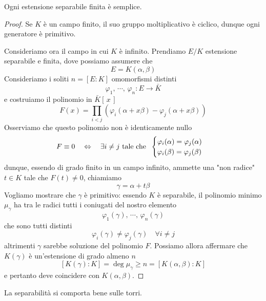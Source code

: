 \begin{multicols}{2}
\begin{theorem}\label{primitivo}
	Ogni estensione separabile finita è semplice.
\end{theorem}
\begin{proof}
	Se $ K $ è un campo finito, il suo gruppo moltiplicativo è ciclico, dunque ogni generatore è primitivo.
	
	Consideriamo ora il campo in cui $ K $ è infinito.
	Prendiamo $ E/K $ estensione separabile e finita, dove possiamo assumere che
	\[ E = K(\alpha, \beta) \]
	Consideriamo i soliti $ n = [E:K] $ omomorfismi distinti
	\[ \varphi_1,\, \cdots,\, \varphi_n : E \to \bar{K}  \]
	e costruiamo il polinomio in $ \bar{K}[\,x\,] $
	\[ F(x) = \prod_{i < j}{\left(\varphi_i(\alpha + x \beta) - \varphi_j(\alpha + x \beta)\right)} \]
	Osserviamo che questo polinomio non è identicamente nullo
	\[ F \equiv 0 \quad\Leftrightarrow\quad \exists i \neq j \text{ tale che }\; \begin{cases}
	\varphi_i(\alpha) = \varphi_j(\alpha) \\
	\varphi_i(\beta) = \varphi_j(\beta)
	\end{cases} \]
	dunque, essendo di grado finito in un campo infinito, ammette una "non radice" $ t \in K $ tale che
	$  F(t) \neq 0  $, chiamiamo 
	\[ \gamma = \alpha + t\beta \]
	Vogliamo mostrare che $ \gamma $ è primitivo: essendo $ K $ è separabile, il polinomio minimo $ \mu_\gamma $ ha tra le radici tutti i coniugati del nostro elemento
	\[ \varphi_1{(\gamma)}, \, \cdots, \, \varphi_n{(\gamma)} \]
	che sono tutti distinti
	\[ \varphi_i(\gamma) \neq \varphi_j(\gamma) \quad\forall i \neq j \]
	altrimenti $ \gamma $ sarebbe soluzione del polinomio $ F $. Possiamo allora affermare che $ K(\gamma) $ è un'estensione di grado almeno $ n $
	\[ [K(\gamma):K] = \deg{\mu_\gamma} \geq n = [K(\alpha, \beta):K] \]
	e pertanto deve coincidere con $ K(\alpha, \beta) $.
\end{proof}

\begin{remark}
	La separabilità si comporta bene sulle torri. 
\end{remark}
\end{multicols}

